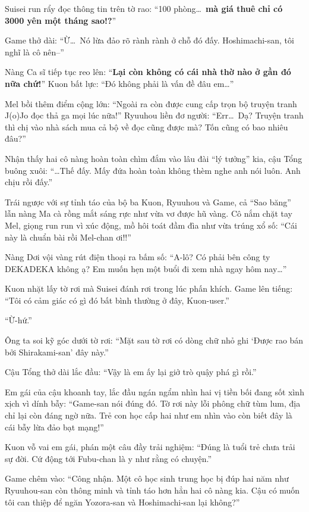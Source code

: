 \documentclass[../main.tex]{subfiles}
\begin{document}

Suisei run rẩy đọc thông tin trên tờ rao: ``100 phòng\dots\ \textbf{mà giá thuê chỉ có 3000 yên một tháng sao!?}''

Game thở dài: ``Ừ\dots\ Nó lừa đảo rõ rành rành ở chỗ đó đấy. Hoshimachi-san, tôi nghĩ là cô nên--''

Nàng Ca sĩ tiếp tục reo lên: ``\textbf{Lại còn không có cái nhà thờ nào ở gần đó nữa chứ!}'' Kuon bất lực: ``Đó không phải là vấn đề đâu em\dots''

Mel bồi thêm điểm cộng lớn: ``Ngoài ra còn được cung cấp trọn bộ truyện tranh J(o)Jo đọc thả ga mọi lúc nữa!'' Ryuuhou liền đơ người: ``Err\dots\ Dạ? Truyện tranh thì chị vào nhà sách mua cả bộ về đọc cũng được mà? Tốn cũng có bao nhiêu đâu?''

Nhận thấy hai cô nàng hoàn toàn chìm đắm vào lâu đài ``lý tưởng'' kia, cậu Tổng buông xuôi: ``\dots Thế đấy. Mấy đứa hoàn toàn không thèm nghe anh nói luôn. Anh chịu rồi đấy.''

Trái ngược với sự tỉnh táo của bộ ba Kuon, Ryuuhou và Game, cả ``Sao băng'' lẫn nàng Ma cà rồng mắt sáng rực như vừa vơ được hũ vàng. Cô nắm chặt tay Mel, giọng run run vì xúc động, mồ hôi toát đầm đìa như vừa trúng xổ số: ``Cái này là chuẩn bài rồi Mel-chan ơi!!''

Nàng Dơi vội vàng rút điện thoại ra bấm số: ``A-lô? Có phải bên công ty DEKADEKA không ạ? Em muốn hẹn một buổi đi xem nhà ngay hôm nay\dots''

Kuon nhặt lấy tờ rơi mà Suisei đánh rơi trong lúc phấn khích. Game lên tiếng: ``Tôi có cảm giác có gì đó bất bình thường ở đây, Kuon-user.''

``Ừ-hứ.''

Ông ta soi kỹ góc dưới tờ rơi: ``Mặt sau tờ rơi có dòng chữ nhỏ ghi `Được rao bán bởi Shirakami-san' đây này.''

Cậu Tổng thở dài lắc đầu: ``Vậy là em ấy lại giở trò quậy phá gì rồi.''

Em gái của cậu khoanh tay, lắc đầu ngán ngẩm nhìn hai vị tiền bối đang sốt xình xịch vì dính bẫy: ``Game-san nói đúng đó. Tờ rơi này lỗi phông chữ tùm lum, địa chỉ lại còn đáng ngờ nữa. Trẻ con học cấp hai như em nhìn vào còn biết đây là cái bẫy lừa đảo bạt mạng!''

Kuon vỗ vai em gái, phán một câu đầy trải nghiệm: ``Đúng là tuổi trẻ chưa trải sự đời. Cứ động tới Fubu-chan là y như rằng có chuyện.''

Game chêm vào: ``Công nhận. Một cô học sinh trung học bị đúp hai năm như Ryuuhou-san còn thông minh và tỉnh táo hơn hẳn hai cô nàng kia. Cậu có muốn tôi can thiệp để ngăn Yozora-san và Hoshimachi-san lại không?''
\end{document}
